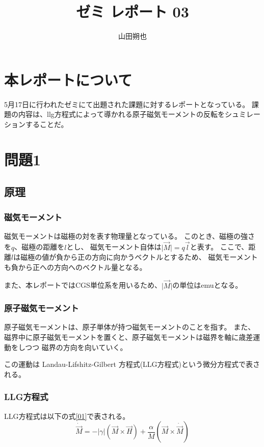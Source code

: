 \documentclass{jsarticle}
\begin{document}
\title{ゼミ レポート 03}
\author{山田朔也}
\maketitle

\section{本レポートについて}
5月17日に行われたゼミにて出題された課題に対するレポートとなっている。
課題の内容は、llg方程式によって導かれる原子磁気モーメントの反転をシュミレーションすることだ。

\section{問題1}
\subsection{原理}
\subsubsection{磁気モーメント}
磁気モーメントは磁極の対を表す物理量となっている。
このとき、磁極の強さを$q$、磁極の距離を$l$とし、
磁気モーメント自体は$\lvert \vec{M} \rvert = q\vec{l}$と表す。
ここで、距離$l$は磁極の値が負から正の方向に向かうベクトルとするため、
磁気モーメントも負から正への方向へのベクトル量となる。

また、本レポートではCGS単位系を用いるため、$\lvert \vec{M} \rvert$の単位はemuとなる。

\subsubsection{原子磁気モーメント}
原子磁気モーメントは、原子単体が持つ磁気モーメントのことを指す。
また、磁界中に原子磁気モーメントを置くと、原子磁気モーメントは磁界を軸に歳差運動をしつつ
磁界の方向を向いていく。

この運動は Landau-Lifshitz-Gilbert 方程式(LLG方程式)という微分方程式で表される。

\subsubsection{LLG方程式}
LLG方程式は以下の式\ref{01}で表される。
\begin{equation}
	\label{01}
	\dot{\vec{M}} = -\lvert\gamma\rvert(\vec{M}\times\vec{H})+\frac{\alpha}{M}(\vec{M}\times\dot{\vec{M}})
\end{equation}
\end{document}
